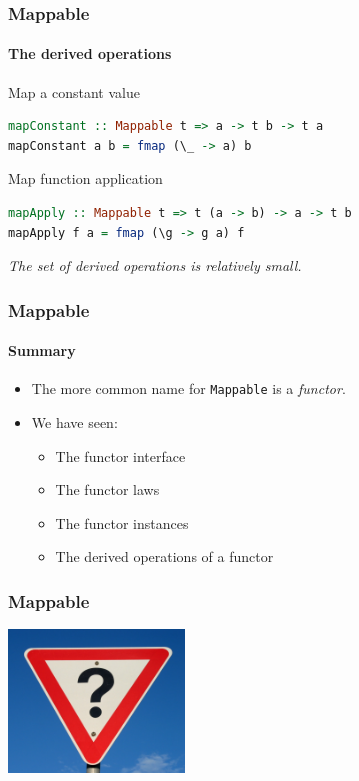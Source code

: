 \begin{frame}[fragile]
\frametitle{Mappable}
\framesubtitle{The derived operations}
\begin{block}{Map a constant value}
\begin{lstlisting}[style=language,language=haskell]
mapConstant :: Mappable t => a -> t b -> t a
mapConstant a b = fmap (\_ -> a) b
\end{lstlisting}
\end{block}
\begin{block}{Map function application}
\begin{lstlisting}[style=language,language=haskell]
mapApply :: Mappable t => t (a -> b) -> a -> t b
mapApply f a = fmap (\g -> g a) f
\end{lstlisting}
\end{block}
\emph{The set of derived operations is relatively small.}
\end{frame}

\begin{frame}[fragile]
\frametitle{Mappable}
\framesubtitle{Summary}
\begin{itemize}
\item The more common name for \lstinline{Mappable} is a \emph{functor}.
\item We have seen:
  \begin{itemize}
  \item The functor interface
  \item The functor laws
  \item The functor instances
  \item The derived operations of a functor
  \end{itemize}
\end{itemize}
\end{frame}

\begin{frame}[fragile]
\frametitle{Mappable}
\begin{center}
\includegraphics[height=3.8cm]{image/Question_mark_road_sign,_Australia.jpg}
\end{center}
\end{frame}
